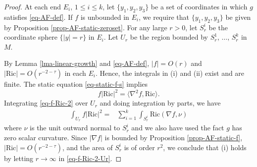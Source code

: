 \documentclass[12pt]{amsart}
\theoremstyle{remark}
\numberwithin{equation}{section}
\newcommand{\Ric}{\mbox{Ric}}
\newcommand{\be}{\begin{equation}}
\newcommand{\ee}{\end{equation}}
\def\la{\langle}
\def\ra{\rangle}
\begin{document}
\begin{proof}
At each end $E_i$, $1 \le i \le k $, let $\{y_1, y_2, y_3\}$ be a set of coordinates in which $g$ satisfies \eqref{eq-AF-def}. If $f$ is unbounded in $E_i$, we  require
that $\{ y_1, y_2, y_3 \}$ be given by  Proposition \ref{prop-AF-static-zeroset}. For any large $r>0$, let $ S^i_r$ be the coordinate sphere $\{ |y|= r \}$ in $E_i$.
Let $ U_r $ be the region bounded by $S^1_r$, $\ldots$, $S^k_r$ in $M$.

By Lemma \ref{lma-linear-growth} and \eqref{eq-AF-def},  $|f| = O (r) $ and  $|\Ric|=O(r^{-2-\tau})$ in each $E_i$. Hence,
 the integrals in (i) and (ii) exist and are finite.
The static equation  \eqref{eq-static-f-s} implies
\be \label{eq-f-Ric-2}
 f | \Ric |^2 = \la \nabla^2 f , \Ric \ra .
 \ee
Integrating \eqref{eq-f-Ric-2} over $U_r$ and doing integration by parts, we have
\be \label{eq-f-Ric-2-Ur}
\begin{split}
\int_{U_r}f| \Ric |^2=& \sum_{i=1}^k \int_{S^i_r } \Ric (\nabla f, \nu)
\end{split}
\ee
where $\nu$ is the unit outward normal to $ S^i_r$ and we also have used the fact $g$ has zero scalar curvature.
Since $|\nabla f|$ is bounded by Proposition \ref{prop-AF-static-f},  $| \Ric |=O(r^{-2-\tau})$, and the area of $S_r^i$ is of order $r^2$, we  conclude that (i) holds  by letting
$ r \rightarrow \infty $ in \eqref{eq-f-Ric-2-Ur}.



\end{proof}
\end{document}
